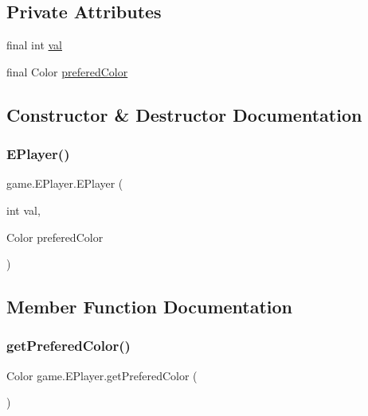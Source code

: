 \subsection*{Private Attributes}
\begin{DoxyCompactItemize}
\item 
final int \mbox{\hyperlink{enumgame_1_1_e_player_a10549bedd1033eba000e3e24b8a57815}{val}}
\item 
final Color \mbox{\hyperlink{enumgame_1_1_e_player_a50552ddfe229efe196441d5414d7d111}{prefered\+Color}}
\end{DoxyCompactItemize}


\subsection{Constructor \& Destructor Documentation}
\mbox{\label{enumgame_1_1_e_player_a89a038b422e068d84335cd0ef4b9aa16}} 
\subsubsection{\texorpdfstring{E\+Player()}{EPlayer()}}
{\footnotesize\ttfamily game.\+E\+Player.\+E\+Player (\begin{DoxyParamCaption}\item[{int}]{val,  }\item[{Color}]{prefered\+Color }\end{DoxyParamCaption})\hspace{0.3cm}{\ttfamily [inline]}}



\subsection{Member Function Documentation}
\mbox{\label{enumgame_1_1_e_player_a81011e36fbbe4b17794af02d65a9dbc5}} 
\subsubsection{\texorpdfstring{get\+Prefered\+Color()}{getPreferedColor()}}
{\footnotesize\ttfamily Color game.\+E\+Player.\+get\+Prefered\+Color (\begin{DoxyParamCaption}{ }\end{DoxyParamCaption})\hspace{0.3cm}{\ttfamily [inline]}}


